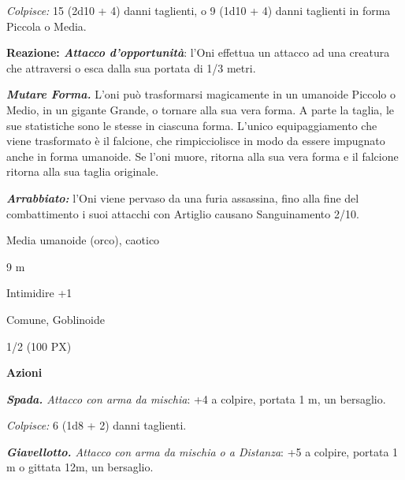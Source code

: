 \begin{multicols}{2}
{\emph{Colpisce:} 15 (2d10 + 4) danni taglienti, o 9 (1d10 + 4) danni taglienti in forma Piccola o Media.

\textbf{Reazione: \emph{Attacco d'opportunità}}: l'Oni effettua un attacco ad una creatura che attraversi o esca dalla sua portata di 1/3 metri.

\emph{\textbf{Mutare Forma.}} L'oni può trasformarsi magicamente in un umanoide Piccolo o Medio, in un gigante Grande, o tornare alla sua vera forma. A parte la taglia, le sue statistiche sono le stesse in ciascuna forma. L'unico equipaggiamento che viene trasformato è il falcione, che rimpicciolisce in modo da essere impugnato anche in forma umanoide. Se l'oni muore, ritorna alla sua vera forma e il falcione ritorna alla sua taglia originale.

\emph{\textbf{Arrabbiato:}} l'Oni viene pervaso da una furia assassina, fino alla fine del combattimento i suoi attacchi con Artiglio causano Sanguinamento 2/10.

\begin{description}[noitemsep, topsep=0pt, parsep=0pt, partopsep=0pt, itemsep=1pt, leftmargin=2.35cm,  labelwidth=2.2cm, itemindent=0cm, listparindent=0pt] %
\setlength{\baselineskip}{10pt}
\item[\textbf{Taglia/Tipo}] Media umanoide (orco), caotico
\item[\textbf{Caratt.}] 
\item[\textbf{Punti Ferita}] 
\item[\textbf{Movimento}] 9 m
\item[\textbf{Tiri Salvez.}] 
\item[\textbf{Comp.}] Intimidire +1
\item[\textbf{Sensi}] 
\item[\textbf{Linguaggi}] Comune, Goblinoide
\item[\textbf{Sfida}] 1/2 (100 PX)
\end{description}
\smallskip

\textbf{Azioni}

\emph{\textbf{Spada.} Attacco con arma da mischia}: +4 a colpire, portata 1 m, un bersaglio.

\emph{Colpisce:} 6 (1d8 + 2) danni taglienti.

\emph{\textbf{Giavellotto.} Attacco con arma da mischia o a Distanza}: +5 a colpire, portata 1 m o gittata 12m, un bersaglio.

}
\end{multicols}
